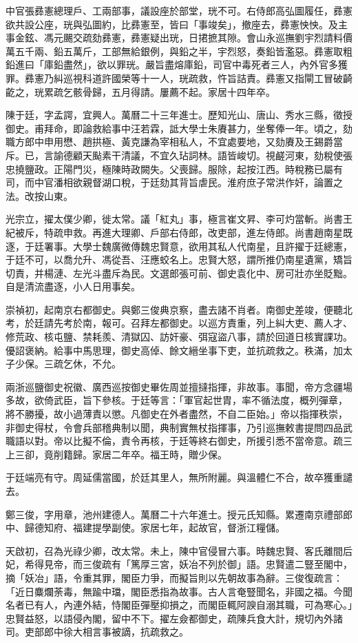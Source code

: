 \begin{pinyinscope}
中官張彞憲總理戶、工兩部事，議設座於部堂，珖不可。右侍郎高弘圖履任，彞憲欲共設公座，珖與弘圖約，比彞憲至，皆曰「事竣矣」，撤座去，彞憲怏怏。及主事金鉉、馮元颺交疏劾彞憲，彞憲疑出珖，日捃摭其隙。會山永巡撫劉宇烈請料價萬五千兩、鉛五萬斤，工部無給銀例，與鉛之半，宇烈怒，奏鉛皆濫惡。彞憲取粗鉛進曰「庫鉛盡然」，欲以罪珖。嚴旨盡熔庫鉛，司官中毒死者三人，內外官多獲罪。彞憲乃糾巡視科道許國榮等十一人，珖疏救，忤旨詰責。彞憲又指閘工冒破齮齕之，珖累疏乞骸骨歸，五月得請。屢薦不起。家居十四年卒。

陳于廷，字孟諤，宜興人。萬曆二十三年進士。歷知光山、唐山、秀水三縣，徵授御史。甫拜命，即論救給事中汪若霖，詆大學士朱賡甚力，坐奪俸一年。頃之，劾職方郎中申用懋、趙拱極、黃克謙為宰相私人，不宜處要地，又劾賡及王錫爵當斥。已，言諭德顧天颭素干清議，不宜久玷詞林。語皆峻切。視鹺河東，劾稅使張忠撓鹽政。正陽門災，極陳時政闕失。父喪歸。服除，起按江西。時稅務已屬有司，而中官潘相欲親督湖口稅，于廷劾其背旨虐民。淮府庶子常洪作奸，論置之法。改按山東。

光宗立，擢太僕少卿，徙太常。議「紅丸」事，極言崔文昇、李可灼當斬。尚書王紀被斥，特疏申救。再進大理卿、戶部右侍郎，改吏部，進左侍郎。尚書趙南星既逐，于廷署事。大學士魏廣微傳魏忠賢意，欲用其私人代南星，且許擢于廷總憲，于廷不可，以喬允升、馮從吾、汪應蛟名上。忠賢大怒，謂所推仍南星遺黨，矯旨切責，并楊漣、左光斗盡斥為民。文選郎張可前、御史袁化中、房可壯亦坐貶黜。自是清流盡逐，小人日用事矣。

崇禎初，起南京右都御史。與鄭三俊典京察，盡去諸不肖者。南御史差竣，便聽北考，於廷請先考於南，報可。召拜左都御史。以巡方責重，列上糾大吏、薦人才、修荒政、核屯鹽、禁耗羨、清獄囚、訪奸豪、弭寇盜八事，請於回道日核實課功。優詔褒納。給事中馬思理，御史高倬、餘文縉坐事下吏，並抗疏救之。秩滿，加太子少保。三疏乞休，不允。

兩浙巡鹽御史祝徽、廣西巡按御史畢佐周並擅撻指揮，非故事。事聞，帝方念疆場多故，欲倚武臣，旨下參核。于廷等言：「軍官起世胄，率不循法度，概列彈章，將不勝擾，故小過薄責以懲。凡御史在外者盡然，不自二臣始。」帝以指揮秩崇，非御史得杖，令會兵部稽典制以聞，典制實無杖指揮事，乃引巡撫敕書提問四品武職語以對。帝以比擬不倫，責令再核，于廷等終右御史，所援引悉不當帝意。疏三上三卻，竟削籍歸。家居二年卒。福王時，贈少保。

于廷端亮有守。周延儒當國，於廷其里人，無所附麗。與溫體仁不合，故卒獲重譴去。

鄭三俊，字用章，池州建德人。萬曆二十六年進士。授元氏知縣。累遷南京禮部郎中、歸德知府、福建提學副使。家居七年，起故官，督浙江糧儲。

天啟初，召為光祿少卿，改太常。未上，陳中官侵冒六事。時魏忠賢、客氏離間后妃，希得見帝，而三俊疏有「篤厚三宮，妖冶不列於御」語。忠賢遣二豎至閣中，摘「妖冶」語，令重其罪，閣臣力爭，而擬旨則以先朝故事為辭。三俊復疏言：「近日麋爛荼毒，無踰中璫，閣臣悉指為故事。古人言奄豎聞名，非國之福。今聞名者已有人，內連外結，恃閣臣彈壓抑損之，而閣臣輒阿諛自溺其職，可為寒心。」忠賢益怒，以語侵內閣，留中不下。擢左僉都御史，疏陳兵食大計，規切內外諸司。吏部郎中徐大相言事被謫，抗疏救之。


\end{pinyinscope}
